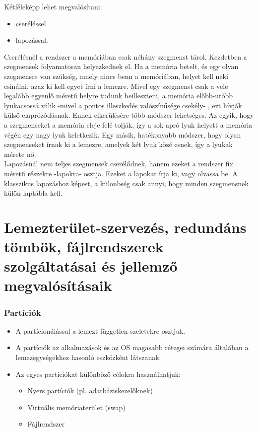 \documentclass[tikz,12pt,margin=0px]{article}
\begin{document}
    \noindent Kétféleképp lehet megvalósítani:
    \begin{itemize}[topsep=8pt,itemsep=4pt,partopsep=4pt, parsep=4pt]
        \item cseréléssel
        \item lapozással.
    \end{itemize}

    \noindent Cserélésnél a rendszer a memóriában csak néhány szegmenst tárol. Kezdetben a szegmensek folyamatosan helyezkednek el. Ha a memória betelt, és egy olyan szegmensre van szükség, amely nincs benn a memóriában, helyet kell neki csinálni, azaz ki kell egyet írni a lemezre. Mivel egy szegmenst csak a vele legalább egyenlő méretű helyre tudunk beilleszteni, a memória előbb-utóbb lyukacsossá válik -mivel a pontos illeszkedés valószínűsége csekély- , ezt hívják külső elaprózódásnak. Ennek elkerülésére több módszer lehetséges. Az egyik, hogy a szegmenseket a memória eleje felé tolják, így a sok apró lyuk helyett a memória végén egy nagy lyuk keletkezik. Egy másik, hatékonyabb módszer, hogy olyan szegmenseket írnak ki a lemezre, amelyek két lyuk közé esnek, így a lyukak mérete nő.\\

    \noindent Lapozásnál nem teljes szegmensek cserélődnek, hanem ezeket a rendszer fix méretű részekre -lapokra- osztja. Ezeket a lapokat írja ki, vagy olvassa be. A klasszikus lapozáshoz képest, a különbség csak annyi, hogy minden szegmensnek külön laptábla kell.

	\section*{Lemezterület-szervezés, redundáns tömbök, fájlrendszerek szolgáltatásai és jellemző megvalósításaik}
	
    \subsubsection*{Partíciók}

    \begin{itemize}[topsep=8pt,itemsep=4pt,partopsep=4pt, parsep=4pt]
        \item A partícionálással a lemezt független szeletekre osztjuk.
        \item A partíciók az alkalmazások és az OS magasabb rétegei számára általában a lemezegységekhez hasonló eszközként látszanak.
        \item Az egyes partíciókat különböző célokra használhatjuk:
        \begin{itemize}
            \item Nyers partíciók (pl. adatbáziskezelőknek)
            \item Virtuális memóriaterület (swap)
            \item Fájlrendszer
        \end{itemize}
    \end{itemize}
\end{document}
